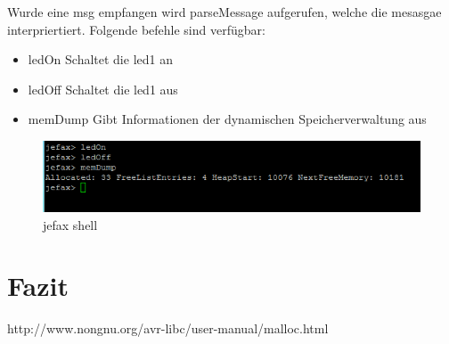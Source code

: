 \documentclass[fontsize=12pt, toc=bibliography, notitlepage]{scrreprt}
\begin{document}
Wurde eine msg empfangen wird parseMessage aufgerufen, welche die mesasgae interpriertiert. Folgende befehle sind verfügbar:

\begin{itemize}
	\item ledOn Schaltet die led1 an
	\item ledOff Schaltet die led1 aus
	\item memDump Gibt Informationen der dynamischen Speicherverwaltung aus
\end{itemize}

\begin{figure}[H]
	\centering
	\includegraphics[width=450px]{images/shell.png}
	\caption{jefax shell}
	\label{fig:shell}
\end{figure}

\chapter{Fazit}
\label{chap:fazit}

\begin{thebibliography}{999}
	http://www.nongnu.org/avr-libc/user-manual/malloc.html
\end{thebibliography}

\cleardoublepage
{}
\listoffigures
\end{document}
